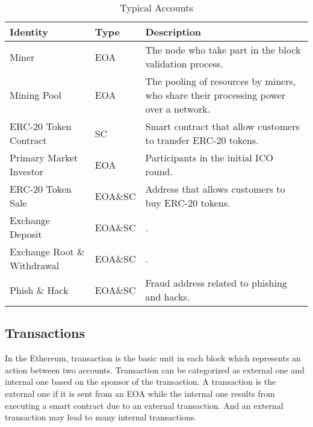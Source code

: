\begin{table}[htbp]
\caption{Typical Accounts}
\begin{center}
\begin{tabular}{|p{1.8cm}|l|p{3.7cm}|}
\hline
\textbf{Identity} & \textbf{Type}& \textbf{Description} \\
\hline
Miner & EOA & The node who take part in the block validation process. \\ \hline
Mining Pool & EOA & The pooling of resources by miners, who share their processing power over a network.\\ \hline
ERC-20 Token Contract & SC & Smart contract that allow customers to transfer ERC-20 tokens. \\ \hline
Primary Market Investor & EOA & Participants in the initial ICO round. \\ \hline
ERC-20 Token Sale & EOA\&SC & Address that allows customers to buy ERC-20 tokens. \\ \hline
Exchange Deposit & EOA\&SC & . \\ \hline
Exchange Root \& Withdrawal & EOA\&SC & . \\ \hline
Phish \& Hack & EOA\&SC & Fraud address related to phishing and hacks. \\ \hline
\end{tabular}
\label{tab1}
\end{center}
\end{table}






\subsection{Transactions}
In the Ethereum, transaction is the basic unit in each block which represents an action between two accounts. Transaction can be categorized as external one and internal one based on the sponsor of the transaction. A transaction is the external one if it is sent from an EOA while the internal one results from executing a smart contract due to an external transaction. And an external transaction may lead to many internal transactions\cite{chen2018infocom}.

